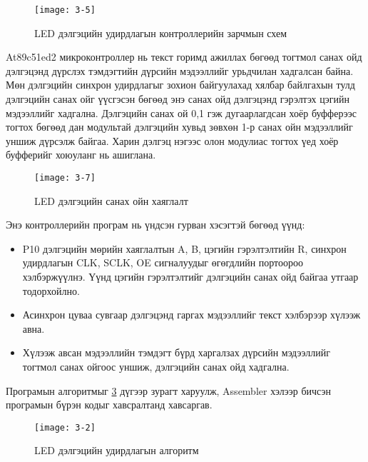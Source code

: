\begin{figure}[!ht]
	\centering
	\begin{turn}{90}
	\texttt{[image: 3-5]}
\end{turn}
	\caption{LED дэлгэцийн удирдлагын контроллерийн зарчмын схем}
	\label{fig:3-3}
\end{figure}

\newpage

At89c51ed2 микроконтроллер нь текст горимд ажиллах бөгөөд тогтмол санах ойд дэлгэцэнд дүрслэх тэмдэгтийн дүрсийн мэдээллийг урьдчилан хадгалсан байна. \\

Мөн дэлгэцийн синхрон удирдлагыг зохион байгуулахад хялбар байлгахын тулд дэлгэцийн санах ойг үүсгэсэн бөгөөд энэ санах ойд дэлгэцэнд гэрэлтэх цэгийн мэдээллийг хадгална. Дэлгэцийн санах ой 0,1 гэж дугаарлагдсан хоёр буфферээс тогтох бөгөөд дан модультай дэлгэцийн хувьд зөвхөн 1-р санах ойн мэдээллийг уншиж дүрсэлж байгаа. Харин дэлгэц нэгээс олон модулиас тогтох үед хоёр буфферийг хоюуланг нь ашиглана. 
 
\begin{figure}[!ht]
	\centering
	\texttt{[image: 3-7]}
	\caption{LED дэлгэцийн санах ойн хаяглалт}
	\label{fig:3-4a}
\end{figure}

Энэ контроллерийн програм нь үндсэн гурван хэсэгтэй бөгөөд үүнд: 
\begin{itemize}
	\item P10 дэлгэцийн мөрийн хаяглалтын A, B, цэгийн гэрэлтэлтийн R, синхрон удирдлагын CLK, SCLK, OE сигналуудыг өгөгдлийн портоороо хэлбэржүүлнэ. Үүнд цэгийн гэрэлтэлтийг дэлгэцийн санах ойд байгаа утгаар тодорхойлно. 
	\item Асинхрон цуваа сувгаар дэлгэцэнд гаргах мэдээллийг текст хэлбэрээр хүлээж авна. 
	\item Хүлээж авсан мэдээллийн тэмдэгт бүрд харгалзах дүрсийн мэдээллийг тогтмол санах ойгоос уншиж, дэлгэцийн санах ойд хадгална.
\end{itemize}	
	 Програмын алгоритмыг \ref{fig:3-4} дүгээр зурагт харуулж, Assembler хэлээр бичсэн програмын бүрэн кодыг хавсралтанд хавсаргав. 
\begin{figure}[!ht]
	\centering
	\texttt{[image: 3-2]}
	\caption{LED дэлгэцийн удирдлагын алгоритм}
	\label{fig:3-4}
\end{figure}
\newpage


